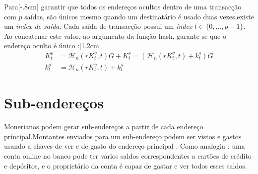 Para[-.8cm] garantir que todos os endereços ocultos dentro de uma transacção com $p$ saídas, são únicos mesmo quando um destinatário é usado duas vezes,\newline existe um {\em index de saída}.\newline 
Cada saída de transacção possui um {\em index} $t \in \{0, ..., p-1\}$.\newline
Ao concatenar este valor, ao argumento da função hash, garante-se que o endereço oculto é único :[1.2cm]
\vspace{.175cm}%
	\begin{align*}
	  K_t^o &= \mathcal{H}_n(r K_t^v, t)G + K_t^s = (\mathcal{H}_n(r K_t^v, t) + k_t^s)G  \\ 
	  k_t^o &= \mathcal{H}_n(r K_t^v, t) + k_t^s
	\end{align*} 

\section{Sub-endereços}
\label{sec:subaddresses}

Monerianos podem gerar sub-endereços a partir de cada endereço príncipal.\newline Montantes enviados para um sub-endereço podem ser vistos e gastos usando a chaves de ver e de gasto do endereço principal \cite{MRL-0006-subaddresses}. Como analogia : uma conta  online no banco pode ter vários saldos correspondentes a cartões de crédito e depósitos, e o proprietário da conta é capaz de gastar e ver todos esses saldos.

